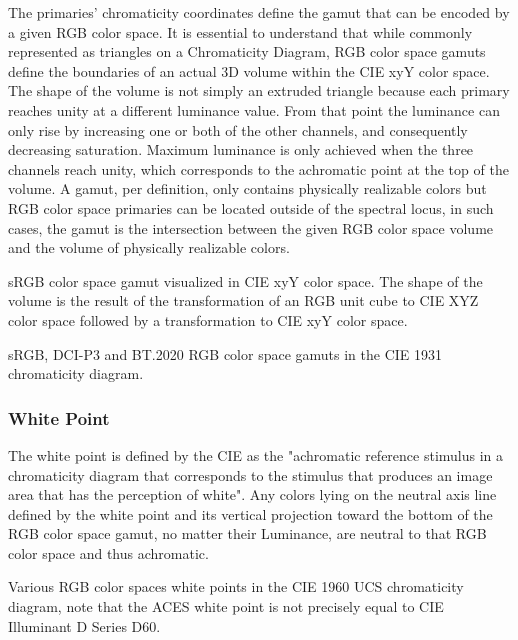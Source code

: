 The primaries’ chromaticity coordinates define the gamut that can be encoded by a given RGB color space. It is essential to understand that while commonly represented as triangles on a Chromaticity Diagram, RGB color space gamuts define the boundaries of an actual 3D volume within the CIE xyY color space. The shape of the volume is not simply an extruded triangle because each primary reaches unity at a different luminance value. From that point the luminance can only rise by increasing one or both of the other channels, and consequently decreasing saturation. Maximum luminance is only achieved when the three channels reach unity, which corresponds to the achromatic point at the top of the volume.
A gamut, per definition, only contains physically realizable colors but RGB color space primaries can be located outside of the spectral locus, in such cases, the gamut is the intersection between the given RGB color space volume and the volume of physically realizable colors.

sRGB color space gamut visualized in CIE xyY color space. The shape of the volume is the result of the transformation of an RGB unit cube to CIE XYZ color space followed by a transformation to CIE xyY color space.


sRGB, DCI-P3 and BT.2020 RGB color space gamuts in the CIE 1931 chromaticity diagram.

\subsubsection{White Point}%
\label{subsubsec:white-point}

The white point is defined by the CIE as the "achromatic reference stimulus in a chromaticity diagram that corresponds to the stimulus that produces an image area that has the perception of white". Any colors lying on the neutral axis line defined by the white point and its vertical projection toward the bottom of the RGB color space gamut, no matter their Luminance, are neutral to that RGB color space and thus achromatic.

Various RGB color spaces white points in the CIE 1960 UCS chromaticity diagram, note that the ACES white point is not precisely equal to CIE Illuminant D Series D60.

